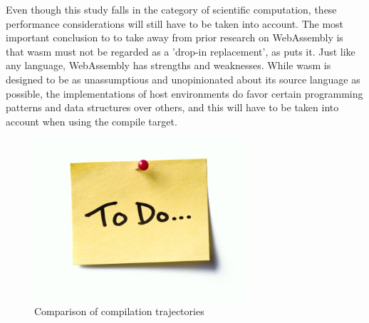 Even though this study falls in the category of scientific computation, these performance considerations will still have to be taken into account. The most important conclusion to to take away from prior research on WebAssembly is that \ac{wasm} must not be regarded as a 'drop-in replacement', as \cite{melch_performance_2019} puts it. Just like any language, WebAssembly has strengths and weaknesses. While \ac{wasm} is designed to be as unassumptious and unopinionated about its source language as possible, the implementations of host environments do favor certain programming patterns and data structures over others, and this will have to be taken into account when using the compile target.

\begin{figure}[!tbp]
  \centering
  \begin{minipage}[b]{0.80\textwidth}
    \graphicspath{ {../../assets/images/misc/} }
    \includegraphics[width=300px]{todo.jpg}
    \caption{Comparison of compilation trajectories}
    \label{fig:wasm-trajectory}
  \end{minipage}
\end{figure}



